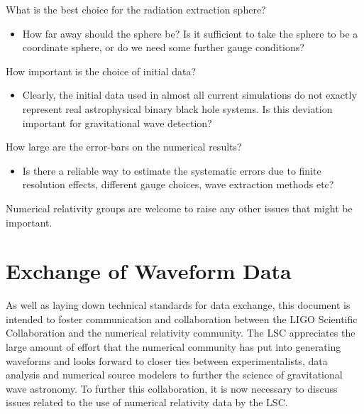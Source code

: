 \documentclass[10pt]{ligodcc}
\begin{document}
What is the best choice for the radiation extraction sphere?
\begin{itemize}
\item How far away should the sphere be?  Is it sufficient to take the
  sphere to be a coordinate sphere, or do we need some further gauge
  conditions?
\end{itemize}
How important is the choice of initial data?
\begin{itemize}
\item Clearly, the initial data used in almost all current simulations
  do not exactly represent real astrophysical binary black hole
  systems.  Is this deviation important for gravitational wave
  detection?
\end{itemize}
How large are the error-bars on the numerical results?
\begin{itemize}
\item Is there a reliable way to estimate the systematic errors due to
  finite resolution effects, different gauge choices, wave extraction
  methods etc?  
\end{itemize}

Numerical relativity groups are welcome to raise any other issues that
might be important.


\section{Exchange of Waveform Data}
\label{sec:authorship}

As well as laying down technical standards for data exchange, this
document is intended to foster communication and collaboration between
the LIGO Scientific Collaboration and the numerical relativity
community. The LSC appreciates the large amount of effort that the
numerical community has put into generating waveforms and looks
forward to closer ties between experimentalists, data analysis and
numerical source modelers to further the science of gravitational wave
astronomy.  To further this collaboration, it is now necessary to
discuss issues related to the use of numerical relativity data by the
LSC.
\end{document}
